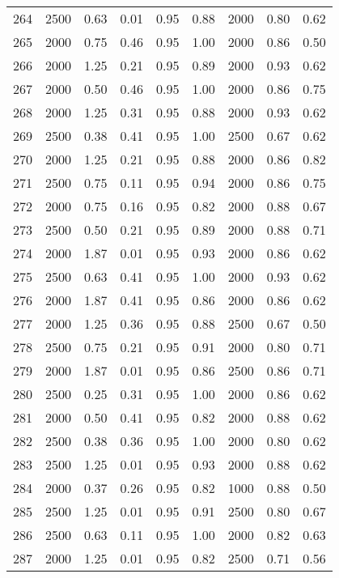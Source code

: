 \begin{longtable}[c]{ccccccccc}
264 &  2500 &  0.63 &  0.01 &  0.95 &  0.88 &  2000 &  0.80 &  0.62 \\
265 &  2000 &  0.75 &  0.46 &  0.95 &  1.00 &  2000 &  0.86 &  0.50 \\
266 &  2000 &  1.25 &  0.21 &  0.95 &  0.89 &  2000 &  0.93 &  0.62 \\
267 &  2000 &  0.50 &  0.46 &  0.95 &  1.00 &  2000 &  0.86 &  0.75 \\
268 &  2000 &  1.25 &  0.31 &  0.95 &  0.88 &  2000 &  0.93 &  0.62 \\
269 &  2500 &  0.38 &  0.41 &  0.95 &  1.00 &  2500 &  0.67 &  0.62 \\
270 &  2000 &  1.25 &  0.21 &  0.95 &  0.88 &  2000 &  0.86 &  0.82 \\
271 &  2500 &  0.75 &  0.11 &  0.95 &  0.94 &  2000 &  0.86 &  0.75 \\
272 &  2000 &  0.75 &  0.16 &  0.95 &  0.82 &  2000 &  0.88 &  0.67 \\
273 &  2500 &  0.50 &  0.21 &  0.95 &  0.89 &  2000 &  0.88 &  0.71 \\
274 &  2000 &  1.87 &  0.01 &  0.95 &  0.93 &  2000 &  0.86 &  0.62 \\
275 &  2500 &  0.63 &  0.41 &  0.95 &  1.00 &  2000 &  0.93 &  0.62 \\
276 &  2000 &  1.87 &  0.41 &  0.95 &  0.86 &  2000 &  0.86 &  0.62 \\
277 &  2000 &  1.25 &  0.36 &  0.95 &  0.88 &  2500 &  0.67 &  0.50 \\
278 &  2500 &  0.75 &  0.21 &  0.95 &  0.91 &  2000 &  0.80 &  0.71 \\
279 &  2000 &  1.87 &  0.01 &  0.95 &  0.86 &  2500 &  0.86 &  0.71 \\
280 &  2500 &  0.25 &  0.31 &  0.95 &  1.00 &  2000 &  0.86 &  0.62 \\
281 &  2000 &  0.50 &  0.41 &  0.95 &  0.82 &  2000 &  0.88 &  0.62 \\
282 &  2500 &  0.38 &  0.36 &  0.95 &  1.00 &  2000 &  0.80 &  0.62 \\
283 &  2500 &  1.25 &  0.01 &  0.95 &  0.93 &  2000 &  0.88 &  0.62 \\
284 &  2000 &  0.37 &  0.26 &  0.95 &  0.82 &  1000 &  0.88 &  0.50 \\
285 &  2500 &  1.25 &  0.01 &  0.95 &  0.91 &  2500 &  0.80 &  0.67 \\
286 &  2500 &  0.63 &  0.11 &  0.95 &  1.00 &  2000 &  0.82 &  0.63 \\
287 &  2000 &  1.25 &  0.01 &  0.95 &  0.82 &  2500 &  0.71 &  0.56 \\

\end{longtable}
